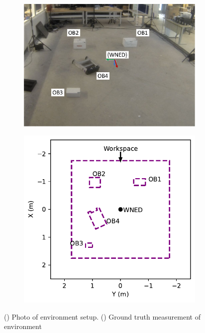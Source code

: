 \begin{figure}[!htb]
  \centering
  \begin{subfigure}[t]{.50\linewidth}
    \centering  \includegraphics[page=2,clip,trim=0cm 1cm 0cm 0cm,width=.99\linewidth]{chapter_7_experiments/imgs/ExperimentSetup.pdf}
    \caption{\label{fig:ch7_workspace_a}}
  \end{subfigure}
  \begin{subfigure}[t]{.35\linewidth}
    \centering\includegraphics[page=1,clip,trim=0cm 0cm 0cm 0cm,width=.99\linewidth]{chapter_7_experiments/imgs/workspace_plot.pdf}
    \caption{\label{fig:ch7_workspace_b}}
  \end{subfigure}

  \caption[Photo of Environmental Setup]{() Photo of environment setup. () Ground truth measurement of environment}\label{fig:ch7_workspace}
\end{figure}

